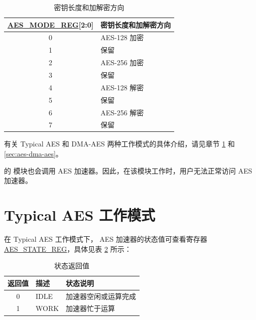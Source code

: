 \documentclass[main\_\_CN.tex]{subfiles}
\begin{document}
\begin{longtable}[c]{ | c | l | }
\caption{密钥长度和加解密方向}
\label{tab:aes-operation}
\\\hline
\rowcolor{lightgray}
\textbf{\hyperref[regdesc:AESMODEREG]{AES\_MODE\_REG}[2:0]}     & \textbf{密钥长度和加解密方向}\\
    \hline
    0                   & AES-128 加密    \\
    \hline
    1                   & 保留    \\
    \hline
    2                   & AES-256 加密    \\
    \hline
    3                   & 保留    \\
    \hline
    4                   & AES-128 解密    \\
    \hline
    5                   & 保留    \\
    \hline
    6                   & AES-256 解密    \\
    \hline
    7                   & 保留    \\
    \hline
\end{longtable}

有关 Typical AES 和 DMA-AES 两种工作模式的具体介绍，请见章节 \ref{sec:aes-typical-modes} 和 \ref{sec:aes-dma-aes}。

\begin{importantlisting}
\vspace{-0.5em}

    \chipname{} 的 模块也会调用 AES 加速器。因此，在该模块工作时，用户无法正常访问 AES 加速器。
\end{importantlisting}

\section{Typical AES 工作模式}\label{sec:aes-typical-modes}

在 Typical AES 工作模式下，
AES 加速器的状态值可查看寄存器 \hyperref[regdesc:AESSTATEREG]{AES\_STATE\_REG}，具体见表 \ref{tab:aes-state-value-typical} 所示：

\begin{longtable}[c]{ |c | l | l | }
\caption{状态返回值}
\label{tab:aes-state-value-typical}
\\\hline
\rowcolor{lightgray}
\textbf{返回值} & \textbf{描述} &  \textbf{状态说明} \\ \hline

    0                   & IDLE      &   加速器空闲或运算完成\\ \hline
    1                   & WORK      &   加速器忙于运算     \\ \hline
\end{longtable}
\end{document}
